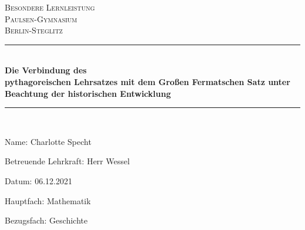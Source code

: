 \begin{titlepage}
\thispagestyle{empty}
\newcommand{\HRule}{\rule{\linewidth}{0.5mm}}
\hspace{1cm}
\center

\textsc{\huge Besondere Lernleistung}\\[2.0cm]
\textsc{\Large Paulsen-Gymnasium}\\[0.8cm]
\textsc{\Large Berlin-Steglitz}\\[0.8cm]
\MSonehalfspacing

\HRule\\%
\MSdoublespacing
{ \huge \bfseries Die Verbindung des \\
pythagoreischen Lehrsatzes mit dem Großen Fermatschen Satz unter Beachtung der historischen Entwicklung}\\[0.2cm]
\HRule \\[2.4cm]
\MSonehalfspacing

\raggedright
\item[{Name:}] Charlotte Specht
\item[{Betreuende Lehrkraft:}] Herr Wessel
\item[{Datum:}] 06.12.2021
\item[{Hauptfach:}] Mathematik
\item[{Bezugsfach:}] Geschichte

\end{titlepage}
\restoregeometry

\tableofcontents
{}
\thispagestyle{empty}

\MSonehalfspacing
\newpage
\pagestyle{fancy}
\setcounter{page}{3}
